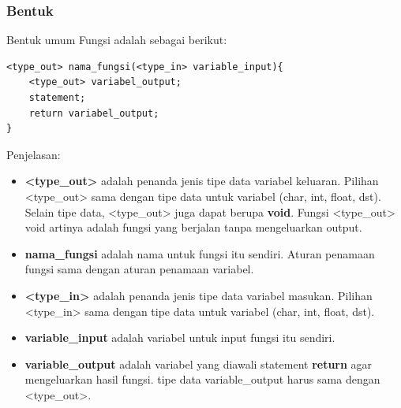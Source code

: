 \documentclass[12pt,]{article}
\begin{document}
	\subsubsection{Bentuk}
	Bentuk umum Fungsi adalah sebagai berikut:
	\begin{verbatim}
<type_out> nama_fungsi(<type_in> variable_input){
	<type_out> variabel_output;
	statement;
	return variabel_output;
}
	\end{verbatim}
	Penjelasan:
	\begin{itemize}
		\item \textbf{<type\_out>} adalah penanda jenis tipe data variabel keluaran.
		Pilihan <type\_out> sama dengan tipe data untuk variabel (char, int, float, dst).
		Selain tipe data, <type\_out> juga dapat berupa \textbf{void}.
		Fungsi <type\_out> void artinya adalah fungsi yang berjalan tanpa mengeluarkan output.

		\item \textbf{nama\_fungsi} adalah nama untuk fungsi itu sendiri.
		Aturan penamaan fungsi sama dengan aturan penamaan variabel.

		\item \textbf{<type\_in>} adalah penanda jenis tipe data variabel masukan.
		Pilihan <type\_in> sama dengan tipe data untuk variabel (char, int, float, dst).

		\item \textbf{variable\_input} adalah variabel untuk input fungsi itu sendiri.

		\item \textbf{variable\_output} adalah variabel yang diawali statement \textbf{return} agar mengeluarkan hasil fungsi.
		tipe data variable\_output harus sama dengan <type\_out>.
	\end{itemize}
\end{document}
